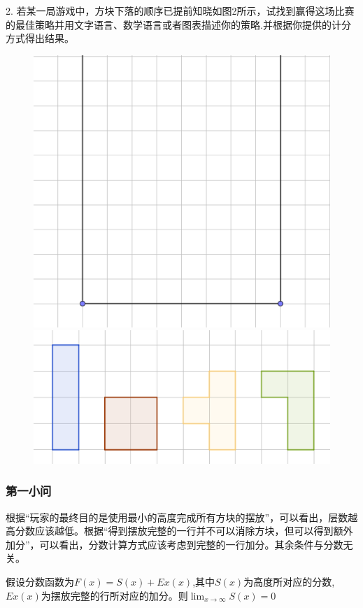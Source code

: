\documentclass[lang=cn,a4paper]{elegantpaper}
\begin{document}
    2. 若某一局游戏中，方块下落的顺序已提前知晓如图2所示，试找到赢得这场比赛的最佳策略并用文字语言、数学语言或者图表描述你的策略.并根据你提供的计分方式得出结果。
    \begin{figure}[H]
        \centering
        \includegraphics[scale=0.2]{Container.png}
        \includegraphics[scale=0.4]{basic units.png}
    \end{figure}
    \subsubsection{第一小问}
    根据“玩家的最终目的是使用最小的高度完成所有方块的摆放”，可以看出，层数越高分数应该越低。根据“得到摆放完整的一行并不可以消除方块，但可以得到额外加分”，可以看出，分数计算方式应该考虑到完整的一行加分。其余条件与分数无关。

    假设分数函数为$F(x)=S(x)+Ex(x)$,其中$S(x)$为高度所对应的分数,$Ex(x)$为摆放完整的行所对应的加分。则$\displaystyle\lim_{x\rightarrow \infty}S(x)=0$
\end{document}
